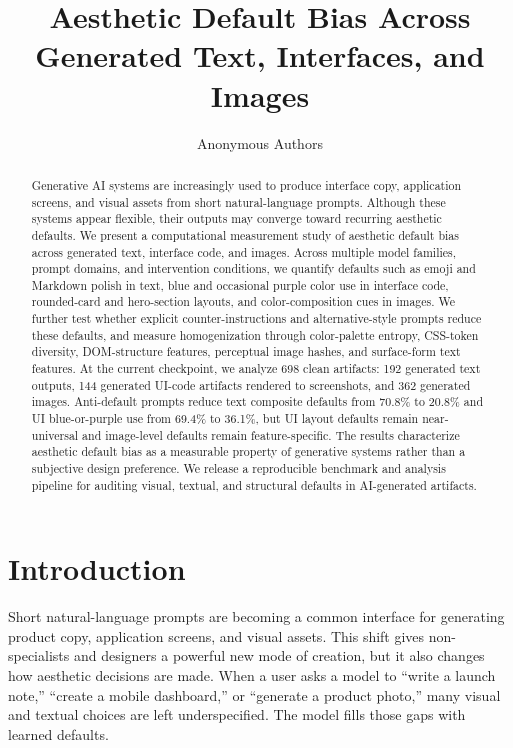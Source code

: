 \documentclass[10pt]{article}
\title{Aesthetic Default Bias Across Generated Text, Interfaces, and Images}
\author{Anonymous Authors}
\date{}
\begin{document}
\maketitle

\begin{abstract}
Generative AI systems are increasingly used to produce interface copy, application screens, and visual assets from short natural-language prompts. Although these systems appear flexible, their outputs may converge toward recurring aesthetic defaults. We present a computational measurement study of aesthetic default bias across generated text, interface code, and images. Across multiple model families, prompt domains, and intervention conditions, we quantify defaults such as emoji and Markdown polish in text, blue and occasional purple color use in interface code, rounded-card and hero-section layouts, and color-composition cues in images. We further test whether explicit counter-instructions and alternative-style prompts reduce these defaults, and measure homogenization through color-palette entropy, CSS-token diversity, DOM-structure features, perceptual image hashes, and surface-form text features. At the current checkpoint, we analyze 698 clean artifacts: 192 generated text outputs, 144 generated UI-code artifacts rendered to screenshots, and 362 generated images. Anti-default prompts reduce text composite defaults from 70.8\% to 20.8\% and UI blue-or-purple use from 69.4\% to 36.1\%, but UI layout defaults remain near-universal and image-level defaults remain feature-specific. The results characterize aesthetic default bias as a measurable property of generative systems rather than a subjective design preference. We release a reproducible benchmark and analysis pipeline for auditing visual, textual, and structural defaults in AI-generated artifacts.
\end{abstract}

\section{Introduction}

Short natural-language prompts are becoming a common interface for generating product copy, application screens, and visual assets. This shift gives non-specialists and designers a powerful new mode of creation, but it also changes how aesthetic decisions are made. When a user asks a model to ``write a launch note,'' ``create a mobile dashboard,'' or ``generate a product photo,'' many visual and textual choices are left underspecified. The model fills those gaps with learned defaults.
\end{document}
